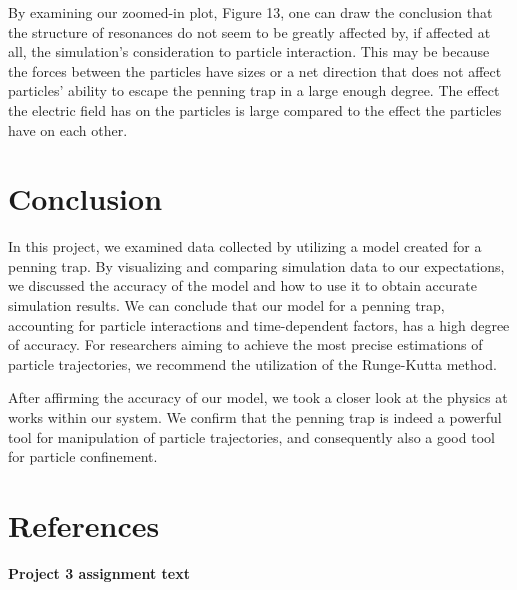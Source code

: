 \documentclass[english,notitlepage,reprint,nofootinbib,twocolumn]{article}
\begin{document}
By examining our zoomed-in plot, Figure 13, one can draw the conclusion that the structure of resonances do not seem to be greatly affected by, if affected at all, the simulation's consideration to particle interaction. This may be because the forces between the particles have sizes or a net direction that does not affect particles' ability to escape the penning trap in a large enough degree. The effect the electric field has on the particles is large compared to the effect the particles have on each other. \\


\section{Conclusion}\label{sec:conclusion}
In this project, we examined data collected by utilizing a model created for a penning trap. By visualizing and comparing simulation data to our expectations, we discussed the accuracy of the model and how to use it to obtain accurate simulation results. We can conclude that our model for a penning trap, accounting for particle interactions and time-dependent factors, has a high degree of accuracy. For researchers aiming to achieve the most precise estimations of particle trajectories, we recommend the utilization of the Runge-Kutta method.

After affirming the accuracy of our model, we took a closer look at the physics at works within our system.
We confirm that the penning trap is indeed a powerful tool for manipulation of particle trajectories, and consequently also a good tool for particle confinement.
\section{References}\label{sec:references}



\textbf{Project 3 assignment text}
\end{document}
